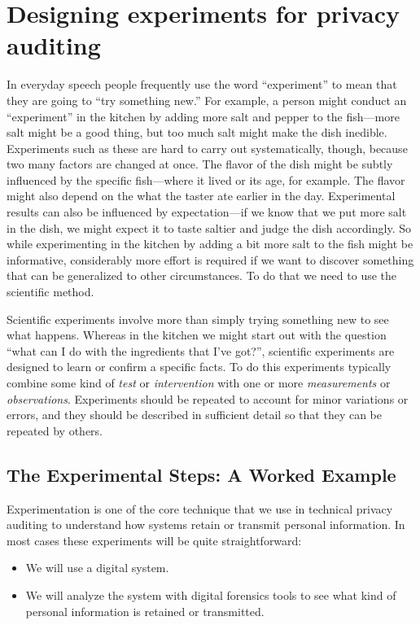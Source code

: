 \chapter{Designing experiments for privacy auditing}

In everyday speech people frequently use the word ``experiment'' to
mean that they are going to ``try something new.'' For example, a
person might conduct an ``experiment'' in the kitchen by adding more
salt and pepper to the fish---more salt might be a good thing, but too
much salt might make the dish inedible.  Experiments such as these are
hard to carry out systematically, though, because two many factors are
changed at once. The flavor of the dish might be subtly influenced by
the specific fish---where it lived or its age, for example. The flavor
might also depend on the what the taster ate earlier in the
day. Experimental results can also be influenced by expectation---if
we know that we put more salt in the dish, we might expect it to taste
saltier and judge the dish accordingly. So while experimenting in the
kitchen by adding a bit more salt to the fish might be informative,
considerably more effort is required if we want to discover something
that can be generalized to other circumstances. To do that we need to
use the scientific method.

Scientific experiments involve more than simply trying something new
to see what happens. Whereas in the kitchen we might start out with
the question ``what can I do with the ingredients that I've got?'',
scientific experiments are designed to learn or confirm a specific
facts. To do this experiments typically combine some kind of
\emph{test} or \emph{intervention} with one or more
\emph{measurements} or \emph{observations}. Experiments should be
repeated to account for minor variations or errors, and they should be
described in sufficient detail so that they can be repeated by
others.

\section{The Experimental Steps: A Worked Example}

Experimentation is one of the core technique that we use in technical privacy
auditing to understand how systems retain or transmit personal
information. In most cases these experiments will be quite
straightforward: 

\begin{itemize}
\item We will use a digital system.
\item We will analyze the system with digital forensics tools to see
  what kind of personal information is retained or transmitted.
\end{itemize}

